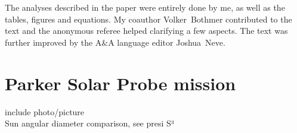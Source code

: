 The analyses described in the paper were entirely done by me, as well as the tables, figures and equations. My coauthor Volker~Bothmer contributed to the text and the anonymous referee helped clarifying a few aspects. The text was further improved by the A\&A language editor Joshua~Neve.\\


\section{Parker Solar Probe mission}

include photo/picture\\
Sun angular diameter comparison, see presi S³\\


